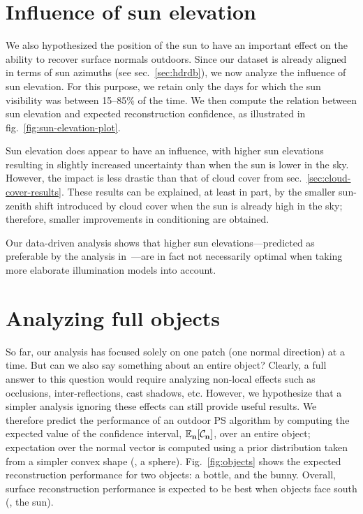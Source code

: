 \section{Influence of sun elevation}
\label{sec:sun-elevation-results}

We also hypothesized the position of the sun to have an important effect on the ability to recover surface normals outdoors. Since our dataset is already aligned in terms of sun azimuths (see sec.~\ref{sec:hdrdb}), we now analyze the influence of sun elevation. For this purpose, we retain only the days for which the sun visibility was between 15--85\% of the time. We then compute the relation between sun elevation and expected reconstruction confidence, as illustrated in fig.~\ref{fig:sun-elevation-plot}.

Sun elevation does appear to have an influence, with higher sun elevations resulting in slightly increased uncertainty than when the sun is lower in the sky. However, the impact is less drastic than that of cloud cover from sec.~\ref{sec:cloud-cover-results}. These results can be explained, at least in part, by the smaller sun-zenith shift introduced by cloud cover when the sun is already high in the sky; therefore, smaller improvements in conditioning are obtained.

Our data-driven analysis shows that higher sun elevations---predicted as preferable by the analysis in~\cite{shen-pg-14}---are in fact not necessarily optimal when taking more elaborate illumination models into account.




\section{Analyzing full objects}

So far, our analysis has focused solely on one patch (one normal direction) at a time. But can we also say something about an entire object? Clearly, a full answer to this question would require analyzing non-local effects such as occlusions, inter-reflections, cast shadows, etc. However, we hypothesize that a simpler analysis ignoring these effects can still provide useful results. We therefore predict the performance of an outdoor PS algorithm by computing the expected value of the confidence interval, $\mathbb{E}_{\bf n}[\mathcal{C}_{\bf n}]$, over an entire object; expectation over the normal vector is computed using a prior distribution taken from a simpler convex shape (\eg, a sphere). Fig.~\ref{fig:objects} shows the expected reconstruction performance for two objects: a bottle, and the bunny. Overall, surface reconstruction performance is expected to be best when objects face south (\ie, the sun).

